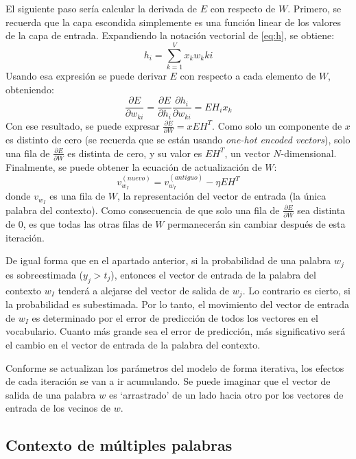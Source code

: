 El siguiente paso sería calcular la derivada de $E$ con respecto de $W$. Primero, se recuerda que la capa escondida simplemente es una función linear de los valores de la capa de entrada. Expandiendo
la notación vectorial de \ref*{eq:h}, se obtiene:
\begin{equation}
  h_i=\sum_{k=1}^Vx_kw_k{ki}
\end{equation}
Usando esa expresión se puede derivar $E$ con respecto a cada elemento de $W$, obteniendo:
\begin{equation}
  \frac{\partial E}{\partial w_{ki}} = \frac{\partial E}{\partial h_i} \frac{\partial h_i}{\partial w_{ki}} = EH_i x_k
\end{equation}
Con ese resultado, se puede expresar $\frac{\partial E}{\partial W}=xEH^T$. Como solo un componente de $x$ es distinto de cero (se recuerda que se están usando \textit{one-hot encoded vectors}), solo
una fila de $\frac{\partial E}{\partial W}$ es distinta de cero, y su valor es $EH^T$, un vector $N$-dimensional.  Finalmente, se puede obtener la ecuación de actualización de $W$:
\begin{equation}
  v_{w_I}^{(nuevo)} = v_{w_I}^{(antiguo)} - \eta EH^T
\end{equation}
donde $v_{w_I}$ es una fila de $W$, la representación del vector de entrada (la única palabra del contexto). Como consecuencia de que solo una fila de $\frac{\partial E}{\partial W}$ sea distinta de 0,
es que todas las otras filas de $W$ permanecerán sin cambiar después de esta iteración.

De igual forma que en el apartado anterior, si la probabilidad de una palabra $w_j$ es sobreestimada ($y_j>t_j$), entonces el vector de entrada de la palabra del contexto $w_I$ tenderá a alejarse del vector de salida
de $w_j$. Lo contrario es cierto, si la probabilidad es subestimada. Por lo tanto, el movimiento del vector de entrada de $w_I$ es determinado por el error de predicción de todos los vectores en el vocabulario. Cuanto más
grande sea el error de predicción, más significativo será el cambio en el vector de entrada de la palabra del contexto.

Conforme se actualizan los parámetros del modelo de forma iterativa, los efectos de cada iteración se van a ir acumulando. Se puede imaginar que el vector de salida de una palabra $w$ es `arrastrado' de un lado hacia otro
por los vectores de entrada de los vecinos de $w$.
\subsection{Contexto de múltiples palabras}

